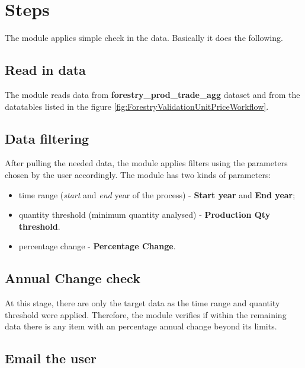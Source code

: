 \documentclass[
]{book}
\providecommand{\tightlist}{%
  \setlength{\itemsep}{0pt}\setlength{\parskip}{0pt}}
\begin{document}
\hypertarget{steps-4}{%
\section{\texorpdfstring{\textbf{Steps}}{Steps}}\label{steps-4}}

The module applies simple check in the data. Basically it does the following.

\hypertarget{read-in-data}{%
\subsection{Read in data}\label{read-in-data}}

The module reads data from \textbf{forestry\_prod\_trade\_agg} dataset and from the datatables listed in the figure \ref{fig:ForestryValidationUnitPriceWorkflow}.

\hypertarget{data-filtering}{%
\subsection{Data filtering}\label{data-filtering}}

After pulling the needed data, the module applies filters using the parameters chosen by the user accordingly. The module has two kinds of parameters:

\begin{itemize}
\tightlist
\item
  time range (\emph{start} and \emph{end} year of the process) - \textbf{Start year} and \textbf{End year};
\item
  quantity threshold (minimum quantity analysed) - \textbf{Production Qty threshold}.
\item
  percentage change - \textbf{Percentage Change}.
\end{itemize}

\hypertarget{annual-change-check}{%
\subsection{Annual Change check}\label{annual-change-check}}

At this stage, there are only the target data as the time range and quantity threshold were applied. Therefore, the module verifies if within the remaining data there is any item with an percentage annual change beyond its limits.

\hypertarget{email-the-user}{%
\subsection{Email the user}\label{email-the-user}}
\end{document}
